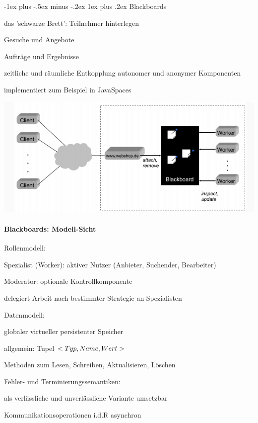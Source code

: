 \documentclass[10pt]{article}
\makeatletter
\renewcommand{\subsubsection}{\@startsection{subsubsection}{3}{0mm}%
                                {-1ex plus -.5ex minus -.2ex}%
                                {1ex plus .2ex}%
                                {\normalfont\small\bfseries}}
\makeatother
\begin{document}
\subsubsection{Blackboards}
\begin{itemize*}
  \item das 'schwarze Brett': Teilnehmer hinterlegen
  \begin{itemize*}
    \item Gesuche und Angebote
    \item Aufträge und Ergebnisse
  \end{itemize*}
  \item zeitliche und räumliche Entkopplung autonomer und anonymer Komponenten
  \item implementiert zum Beispiel in JavaSpaces
\end{itemize*}
\begin{center}
  \includegraphics[width=0.4\linewidth]{Assets/Programmierparadigmen-javaSpaces}
\end{center}

\paragraph{Blackboards: Modell-Sicht}

\begin{itemize*}
  \item Rollenmodell:
  \begin{itemize*}
    \item Spezialist (Worker): aktiver Nutzer (Anbieter, Suchender, Bearbeiter)
    \item Moderator: optionale Kontrollkomponente
    \begin{itemize*}
      \item delegiert Arbeit nach bestimmter Strategie an Spezialisten
      
    \end{itemize*}
  \end{itemize*}
  \item Datenmodell:
  \begin{itemize*}
    \item globaler virtueller persistenter Speicher
    \item allgemein: Tupel \textbf{$<Typ,\space Name, \space Wert>$}
    \item Methoden zum Lesen, Schreiben, Aktualisieren, Löschen
  \end{itemize*}
  \item Fehler- und Terminierungssemantiken:
  \begin{itemize*}
    \item als verlässliche und unverlässliche Variante umsetzbar
    \item Kommunikationsoperationen i.d.R asynchron
  \end{itemize*}
\end{itemize*}
\end{document}
